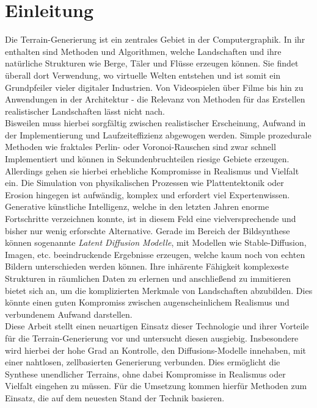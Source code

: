 \chapter{Einleitung}



Die Terrain-Generierung ist ein zentrales Gebiet in der Computergraphik. In ihr enthalten sind Methoden und Algorithmen, welche Landschaften und ihre natürliche Strukturen wie Berge, Täler und Flüsse erzeugen können. Sie findet überall dort Verwendung, wo virtuelle Welten entstehen und ist somit ein Grundpfeiler vieler digitaler Industrien. Von Videospielen über Filme bis hin zu Anwendungen in der Architektur - die Relevanz von Methoden für das Erstellen realistischer Landschaften lässt nicht nach. \\
Bisweilen muss hierbei sorgfältig zwischen realistischer Erscheinung, Aufwand in der Implementierung und Laufzeiteffizienz abgewogen werden. Simple prozedurale Methoden wie fraktales Perlin- oder Voronoi-Rauschen sind zwar schnell Implementiert und können in Sekundenbruchteilen riesige Gebiete erzeugen. Allerdings gehen sie hierbei erhebliche Kompromisse in Realismus und Vielfalt ein. Die Simulation von physikalischen Prozessen wie Plattentektonik oder Erosion hingegen ist aufwändig, komplex und erfordert viel Expertenwissen. \\
Generative künstliche Intelligenz, welche in den letzten Jahren enorme Fortschritte verzeichnen konnte, ist in diesem Feld eine vielversprechende und bisher nur wenig erforschte Alternative. Gerade im Bereich der Bildsynthese können sogenannte \textit{Latent Diffusion Modelle}, mit Modellen wie Stable-Diffusion, Imagen, etc. beeindruckende Ergebnisse erzeugen, welche kaum noch von echten Bildern unterschieden werden können.
Ihre inhärente Fähigkeit komplexeste Strukturen in räumlichen Daten zu erlernen und anschließend zu immitieren bietet sich an, um die komplizierten Merkmale von Landschaften abzubilden. Dies könnte einen guten Kompromiss zwischen augenscheinlichem Realismus und verbundenem Aufwand darstellen. \\
Diese Arbeit stellt einen neuartigen Einsatz dieser Technologie und ihrer Vorteile für die Terrain-Generierung vor und untersucht diesen ausgiebig. Insbesondere wird hierbei der hohe Grad an Kontrolle, den Diffusions-Modelle innehaben, mit einer nahtlosen, zellbasierten Generierung verbunden. Dies ermöglicht die Synthese unendlicher Terrains, ohne dabei Kompromisse in Realismus oder Vielfalt eingehen zu müssen. Für die Umsetzung kommen hierfür Methoden zum Einsatz, die auf dem neuesten Stand der Technik basieren.
 
